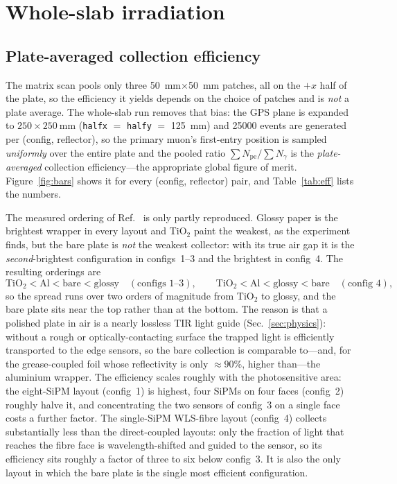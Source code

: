 \documentclass[11pt,a4paper]{article}
\newcommand{\pe}{\ensuremath{N_{\mathrm{pe}}}}
\newcommand{\ngam}{\ensuremath{N_{\gamma}}}
\begin{document}
\section{Whole-slab irradiation}
\label{sec:whole}

\subsection{Plate-averaged collection efficiency}

The matrix scan pools only three \SI{50}{\milli\meter}$\times$\SI{50}{\milli\meter}
patches, all on the $+x$ half of the plate, so the efficiency it yields depends
on the choice of patches and is \emph{not} a plate average. The whole-slab run
removes that bias: the GPS plane is expanded to
$250 \times \SI{250}{\milli\meter}$ (\texttt{halfx} $=$ \texttt{halfy} $=$
\SI{125}{\milli\meter}) and \num{25000} events are generated per
(config, reflector), so the primary muon's first-entry position is sampled
\emph{uniformly} over the entire plate and the pooled ratio
$\sum\pe/\sum\ngam$ is the \emph{plate-averaged} collection efficiency---the
appropriate global figure of merit. Figure~\ref{fig:bars} shows it for every
(config, reflector) pair, and Table~\ref{tab:eff} lists the numbers.

The measured ordering of Ref.~\cite{Rao2025} is only partly reproduced. Glossy
paper is the brightest wrapper in every layout and TiO$_2$ paint the weakest, as
the experiment finds, but the bare plate is \emph{not} the weakest collector:
with its true air gap it is the \emph{second}-brightest configuration in
configs~1--3 and the brightest in config~4. The resulting orderings are
\[
  \text{TiO}_2 < \text{Al} < \text{bare} < \text{glossy}
  \quad(\text{configs 1--3}),
  \qquad
  \text{TiO}_2 < \text{Al} < \text{glossy} < \text{bare}
  \quad(\text{config 4}),
\]
so the spread runs over two orders of magnitude from TiO$_2$ to glossy, and the
bare plate sits near the top rather than at the bottom. The reason is that a
polished plate in air is a nearly lossless TIR light guide
(Sec.~\ref{sec:physics}): without a rough or optically-contacting surface the
trapped light is efficiently transported to the edge sensors, so the bare
collection is comparable to---and, for the grease-coupled foil whose
reflectivity is only $\approx\num{90}\%$, higher than---the aluminium wrapper.
The efficiency scales roughly with the photosensitive area: the eight-SiPM
layout (config~1) is highest, four SiPMs on four faces (config~2) roughly halve
it, and concentrating the two sensors of config~3 on a single face costs a
further factor. The single-SiPM WLS-fibre layout (config~4) collects
substantially less than the direct-coupled layouts: only the fraction of light
that reaches the fibre face is wavelength-shifted and guided to the sensor, so
its efficiency sits roughly a factor of three to six below config~3. It is also
the only layout in which the bare plate is the single most efficient
configuration.
\end{document}

